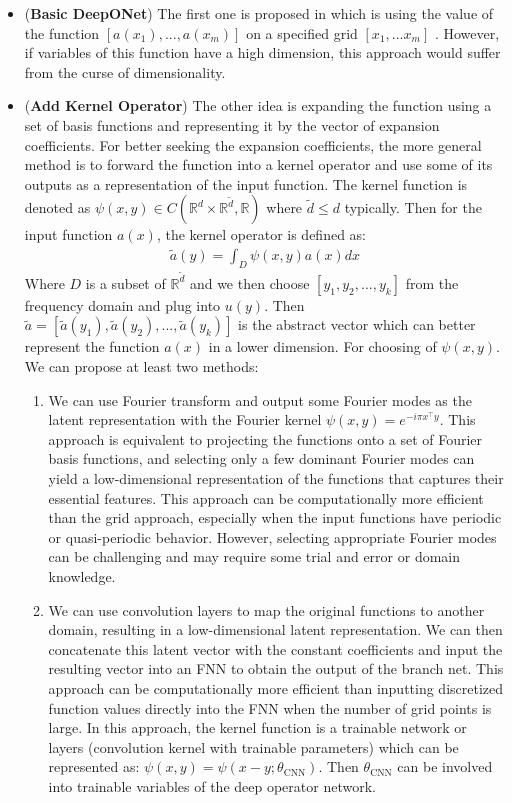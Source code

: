 \documentclass[11pt,a4paper]{article}
\theoremstyle{remark}
\begin{document}
    \begin{itemize}
        \item (\textbf{Basic DeepONet}) The first one is proposed in \cite{lu2021learning} which is using the value of the function $[a(x_1),..., a(x_m)]$ on a specified grid $[x_1,...x_m]$ . However, if variables of this function have a high dimension, this approach would suffer from the curse of dimensionality. 
        \item (\textbf{Add Kernel Operator}) The other idea is expanding the function using a set of basis functions and representing it by the vector of expansion coefficients. For better seeking the expansion coefficients, the more general method is to forward the function into a kernel operator and use some of its outputs as a representation of the input function. The kernel function is denoted as $\psi(x, y) \in C(\mathbb{R}^d \times \mathbb{R}^{\tilde{d}}, \mathbb{R})$ where $\tilde{d} \leq d$ typically. Then for the input function $a(x)$, the kernel operator is defined as:
         \begin{align*}
        	\tilde{a}(y)= \int_{D} \psi(x, y)a(x) dx
        \end{align*}
        Where $D$ is a subset of $ \mathbb{R}^{\tilde{d}}$ and we then choose $[y_1, y_2,...,y_k]$ from the frequency domain and plug into $u(y)$. Then $\tilde{a} = [\tilde{a}(y_1), \tilde{a}(y_2), ..., \tilde{a}(y_k)]$ is the abstract vector which can better represent the function $a(x)$ in a lower dimension.   For choosing of $\psi(x, y)$. We can propose at least two methods:
        \begin{enumerate}
        	\item We can use Fourier transform and output some Fourier modes as the latent representation with the Fourier kernel $\psi(x, y) = e^{-i\pi x^{\top} y}$. This approach is equivalent to projecting the functions onto a set of Fourier basis functions, and selecting only a few dominant Fourier modes can yield a low-dimensional representation of the functions that captures their essential features. This approach can be  computationally more efficient than the grid approach, especially when the input functions have periodic or quasi-periodic behavior. However, selecting appropriate Fourier modes can be challenging and may require some trial and error or domain knowledge. 
        	
        	\item We can use convolution layers to map the original functions to another domain, resulting in a low-dimensional latent representation. We can then concatenate this latent vector with the constant coefficients and input the resulting vector into an FNN to obtain the output of the branch net. This approach can be computationally more efficient than inputting discretized function values directly into the FNN when the number of grid points is large. In this approach, the kernel function is a trainable network or layers (convolution kernel with trainable parameters) which can be represented as: $\psi(x, y) = \psi(x - y; \theta_{\text{CNN}})$. Then $\theta_{\text{CNN}}$ can be involved into trainable variables of the deep operator network.
        	

\end{enumerate}
\end{itemize}
\end{document}
